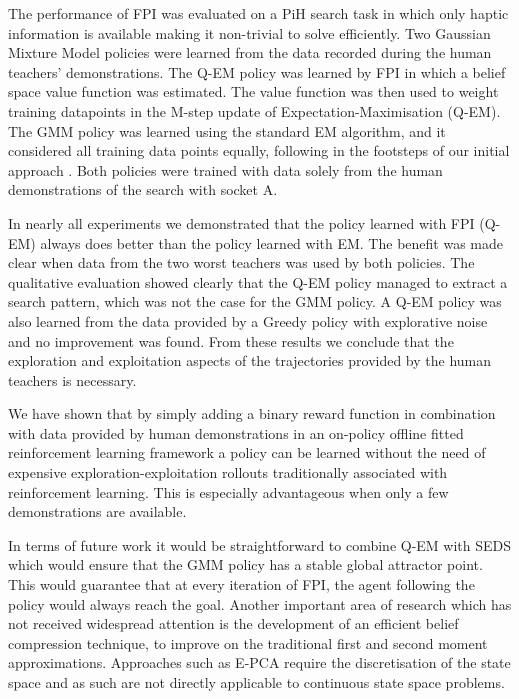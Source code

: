 \documentclass[final,5p,times,twocolumn]{elsarticle}
\begin{document}
The performance of FPI was evaluated on a PiH search task in which only haptic information is available making it 
non-trivial to solve efficiently. Two Gaussian Mixture Model policies were learned from the data recorded during 
the human teachers' demonstrations. The Q-EM policy was learned by FPI in which a belief space value function was estimated.
The value function was then used to weight training datapoints in the M-step update of Expectation-Maximisation (Q-EM). The 
GMM policy was learned using the standard EM algorithm, and it considered all training data points equally,
following in the footsteps of our initial approach \cite{Chambrier2014}. Both policies were trained 
with data solely from the human demonstrations of the search with socket A. 

In nearly all experiments we demonstrated that the policy learned with FPI (Q-EM) always does better than the policy learned with EM.
The benefit was made clear when data from the two worst teachers was used by both policies. 
The qualitative evaluation showed clearly that the Q-EM policy managed to extract a search pattern, 
which was not the case for the GMM policy. A Q-EM policy was also learned from the data provided 
by a Greedy policy with explorative noise and no improvement was found. From these results 
we conclude that the exploration and exploitation aspects of the trajectories provided by the human teachers is necessary.

We have shown that by simply adding a binary reward function in combination with 
data provided by human demonstrations in an on-policy offline fitted reinforcement learning framework 
a policy can be learned without the need of expensive exploration-exploitation rollouts 
traditionally associated with reinforcement learning. This is especially advantageous 
when only a few demonstrations are available.

In terms of future work it would be straightforward to combine Q-EM with SEDS \cite{Khansari_Billard_TRO11} which 
would ensure that the GMM policy has a stable global attractor point. This would guarantee that at every iteration 
of FPI, the agent following the policy would always reach the goal. Another important area of research which has not 
received widespread attention is the development of an efficient belief compression technique, to improve on 
the traditional first and second moment approximations. Approaches such as E-PCA \cite{belief_compression_2005} require the discretisation 
of the state space and as such are not directly applicable to continuous state space problems. 

\FloatBarrier
 

\end{document}
